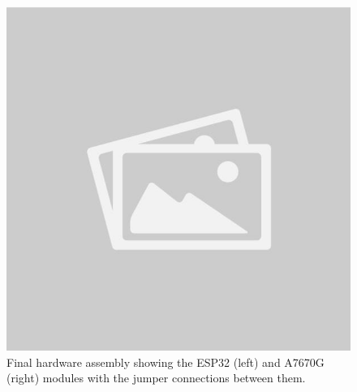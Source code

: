 \begin{figure}[H]
    \centering
    \begin{minipage}{0.48\textwidth} %
        \centering
        \includegraphics[width=\linewidth]{placeholder.jpg} %
        \caption{Final hardware assembly showing the ESP32 (left) and A7670G (right) modules with the jumper connections between them.}
        \label{fig:hardware-photo-modules}
    \end{minipage}
    \hfill %
    \begin{minipage}{0.48\textwidth} %
        \centering

\end{minipage}
\end{figure}

